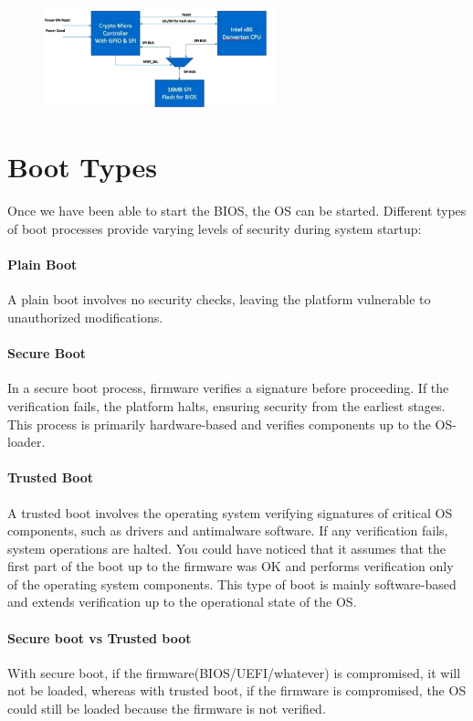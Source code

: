 \begin{figure}[H]
  \centering
  \includegraphics[width=0.6\textwidth]{img/Hw RoT verification.png}
  \label{fig:hw rot}
\end{figure}
\section{Boot Types}
Once we have been able to start the BIOS, the OS can be started.
Different types of boot processes provide varying levels of security
during system startup:

\paragraph{Plain Boot} A plain boot involves no security checks, 
leaving the platform vulnerable to unauthorized modifications.

\paragraph{Secure Boot} In a secure boot process, firmware verifies 
a signature before proceeding. If the verification fails, the platform 
halts, ensuring security from the earliest stages. This process is 
primarily hardware-based and verifies components up to the 
OS-loader.

\paragraph{Trusted Boot} A trusted boot involves the operating system
verifying signatures of critical OS components, such as drivers and
antimalware software. If any verification fails, system operations are
halted. You could have noticed that it assumes that the first part of
the boot up to the firmware was OK and performs verification only of
the operating system components. This type of boot is mainly
software-based and extends verification up to the operational state of
the OS.

\paragraph{Secure boot vs Trusted boot} With secure boot, if the
firmware(BIOS/UEFI/whatever) is compromised, it will not be loaded,
whereas with trusted boot, if the firmware is compromised, the OS
could still be loaded because the firmware is not verified. 


